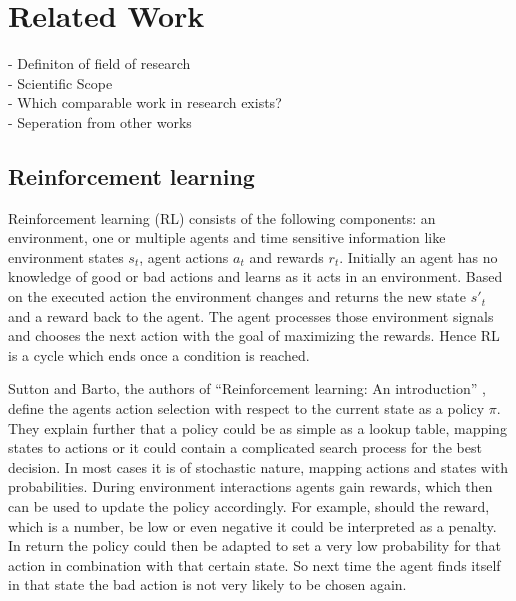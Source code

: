 %
%
\chapter{Related Work}\label{sec:RelatedWork}
- Definiton of field of research \\
- Scientific Scope \\
- Which comparable work in research exists? \\
- Seperation from other works

\section{Reinforcement learning}
Reinforcement learning (RL) consists of the following components: an environment,
one or multiple agents and time sensitive information like environment states $s_{t}$,
agent actions $a_{t}$ and rewards $r_{t}$.
Initially an agent has no knowledge of good or bad actions and learns as it acts in an
environment. Based on the executed action the environment changes and returns the new
state $s'_{t}$ and a reward back to the agent. The agent processes those environment
signals and chooses the next action with the goal of maximizing the rewards. Hence
RL is a cycle which ends once a condition is reached.

Sutton and Barto, the authors of ``Reinforcement learning: An introduction'' \cite{suba18},
define the agents action selection with respect to the current state as a policy $\pi$.
They explain further that a policy could be as simple as a lookup table, mapping
states to actions or it could contain a complicated search process for the best
decision. In most cases it is of stochastic nature, mapping actions and states with
probabilities. During environment interactions agents gain rewards, which then can be
used to update the policy accordingly. For example, should the reward, which is a number,
be low or even negative it could be interpreted as a penalty. In return the policy
could then be adapted to set a very low probability for that action in combination with
that certain state. So next time the agent finds itself in that state the bad action is
not very likely to be chosen again.

